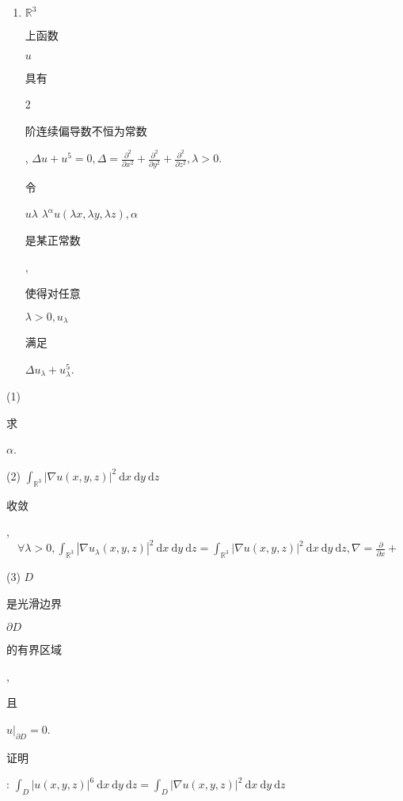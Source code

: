 \documentclass[10pt]{article}
\begin{document}
\begin{enumerate}
  \item $\mathbb{R}^{3}$ \begin{CJK}{UTF8}{mj}上函数\end{CJK} $u$ \begin{CJK}{UTF8}{mj}具有\end{CJK} 2 \begin{CJK}{UTF8}{mj}阶连续偏导数不恒为常数\end{CJK}, $\Delta u+u^{5}=0, \Delta=\frac{\partial^{2}}{\partial x^{2}}+\frac{\partial^{2}}{\partial y^{2}}+\frac{\partial^{2}}{\partial z^{2}}, \lambda>0$. \begin{CJK}{UTF8}{mj}令\end{CJK} $u \lambda$ $\lambda^{\alpha} u(\lambda x, \lambda y, \lambda z), \alpha$ \begin{CJK}{UTF8}{mj}是某正常数\end{CJK}, \begin{CJK}{UTF8}{mj}使得对任意\end{CJK} $\lambda>0, u_{\lambda}$ \begin{CJK}{UTF8}{mj}满足\end{CJK} $\Delta u_{\lambda}+u_{\lambda}^{5}$.

\end{enumerate}
(1) \begin{CJK}{UTF8}{mj}求\end{CJK} $\alpha$.

(2) $\int_{\mathbb{R}^{3}}|\nabla u(x, y, z)|^{2} \mathrm{~d} x \mathrm{~d} y \mathrm{~d} z$ \begin{CJK}{UTF8}{mj}收敛\end{CJK}, $\quad \forall \lambda>0, \int_{\mathbb{R}^{3}}\left|\nabla u_{\lambda}(x, y, z)\right|^{2} \mathrm{~d} x \mathrm{~d} y \mathrm{~d} z=\int_{\mathbb{R}^{3}}|\nabla u(x, y, z)|^{2} \mathrm{~d} x \mathrm{~d} y \mathrm{~d} z, \nabla=\frac{\partial}{\partial x}+$

(3) $D$ \begin{CJK}{UTF8}{mj}是光滑边界\end{CJK} $\partial D$ \begin{CJK}{UTF8}{mj}的有界区域\end{CJK}, \begin{CJK}{UTF8}{mj}且\end{CJK} $\left.u\right|_{\partial D}=0$. \begin{CJK}{UTF8}{mj}证明\end{CJK}: $\int_{D}|u(x, y, z)|^{6} \mathrm{~d} x \mathrm{~d} y \mathrm{~d} z=\int_{D}|\nabla u(x, y, z)|^{2} \mathrm{~d} x \mathrm{~d} y \mathrm{~d} z$
\end{document}
